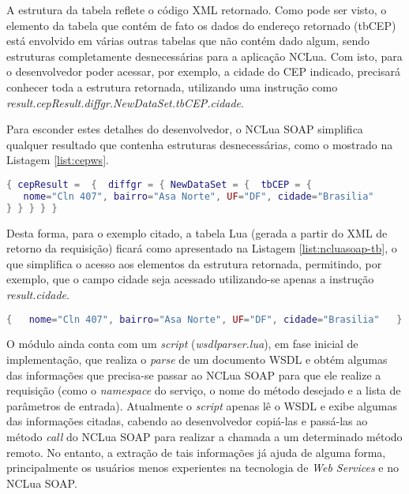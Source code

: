 A estrutura da tabela reflete o código XML retornado. Como pode ser visto, o elemento
da tabela que contém de fato os dados do endereço retornado (tbCEP) está envolvido em 
várias outras tabelas que não contém dado algum, sendo estruturas completamente
desnecessárias para a aplicação NCLua. Com isto, para o desenvolvedor
poder acessar, por exemplo, a cidade do CEP indicado, precisará 
conhecer toda a estrutura retornada, utilizando uma instrução como
\textit{result.cepResult.diffgr.NewDataSet.tbCEP.cidade}.

Para esconder estes detalhes do desenvolvedor, o NCLua SOAP simplifica qualquer
resultado que contenha estruturas desnecessárias, como o mostrado na Listagem \ref{list:cepws}.

\begin{lstlisting}[caption=Exemplo de tabela Lua gerada a partir de um XML de resposta a uma requisição SOAP, label=list:cepws, language=lua]
{ cepResult =  {  diffgr = { NewDataSet = {  tbCEP = {
   nome="Cln 407", bairro="Asa Norte", UF="DF", cidade="Brasilia"
} } } } }
\end{lstlisting}

Desta forma, para o exemplo citado, a tabela Lua (gerada a partir do XML de retorno da requisição) 
ficará como apresentado na Listagem \ref{list:ncluasoap-tb}, o que simplifica
o acesso aos elementos da estrutura retornada, permitindo, por exemplo, que o campo
cidade seja acessado utilizando-se apenas a instrução \textit{result.cidade}.

\begin{lstlisting}[caption=Exemplo de simplificação de retorno de resposta a uma requisição SOAP feita pelo NCLua SOAP, label=list:ncluasoap-tb, language=lua]
{   nome="Cln 407", bairro="Asa Norte", UF="DF", cidade="Brasilia"   }
\end{lstlisting}

O módulo ainda conta com um \textit{script} (\textit{wsdlparser.lua}), em fase inicial de implementação, que realiza
o \textit{parse} de um documento WSDL e obtém algumas das informações que precisa-se
passar ao NCLua SOAP para que ele realize a requisição 
(como o \textit{namespace} do serviço, o nome do método desejado e a lista de parâmetros de entrada).
Atualmente o \textit{script} apenas lê o WSDL e exibe algumas
das informações citadas, cabendo ao desenvolvedor copiá-las e passá-las ao método \textit{call} do
NCLua SOAP para realizar a chamada a um determinado método remoto. No entanto, 
a extração de tais informações já ajuda de alguma forma, principalmente
os usuários menos experientes na tecnologia de \textit{Web Services} e no NCLua SOAP.

